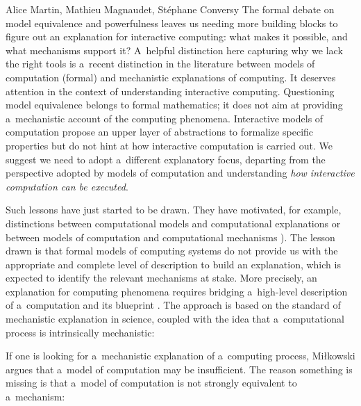 \begin{artengenv2auth}{Alice Martin, Mathieu Magnaudet, Stéphane Conversy}
The formal debate on model equivalence and powerfulness leaves us needing more building blocks to figure out an explanation for interactive computing: what makes it possible, and what mechanisms support it? A~helpful distinction here capturing why we lack the right tools is a~recent distinction in the literature between models of computation (formal) and mechanistic explanations of computing. It deserves attention in the context of understanding interactive computing. Questioning model equivalence belongs to formal mathematics; it does not aim at providing a~mechanistic account of the computing phenomena. Interactive models of computation propose an upper layer of abstractions to formalize specific properties but do not hint at how interactive computation is carried out. We suggest we need to adopt a~different explanatory focus, departing from the perspective adopted by models of computation and understanding \textit{how interactive computation can be executed}. 

Such lessons have just started to be drawn. They have motivated, for example, distinctions between computational models and computational explanations \parencite{Klein2020} or between models of computation and computational mechanisms \parencite{Mikowski2014}). The lesson drawn is that formal models of computing systems do not provide us with the appropriate and complete level of description to build an explanation, which is expected to identify the relevant mechanisms at stake. More precisely, an explanation for computing phenomena requires bridging a~high-level description of a~computation and its blueprint \parencite{Mikowski2011, Mikowski2016}.
The approach is based on the standard of mechanistic explanation in science, coupled with the idea that a~computational process is intrinsically mechanistic: 


If one is looking for a~mechanistic explanation of a~computing process, Miłkowski argues that a~model of computation may be insufficient. The reason something is missing is that a~model of computation is not strongly equivalent to a~mechanism: 


\end{artengenv2auth}
